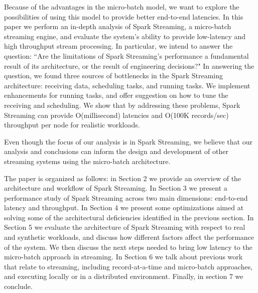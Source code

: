 
Because of the advantages in the micro-batch model, we want to explore the possibilities of using this model to provide better end-to-end latencies. In this paper we perform an in-depth analysis of Spark Streaming, a micro-batch streaming engine, and evaluate the system's ability to provide low-latency and high throughput stream processing.
In particular, we intend to answer the question: ``Are the limitations of Spark Streaming's performance a fundamental result of its architecture, or the result of engineering decisions?"
In answering the question, we found three sources of bottlenecks in the Spark Streaming architecture: receiving data, scheduling tasks, and running tasks. We implement enhancements for running tasks, and offer suggestion on how to tune the receiving and scheduling. We show that by addressing these problems, Spark Streaming can provide O(millisecond) latencies and O(100K records/sec) throughput per node for realistic workloads.

Even though the focus of our analysis is in Spark Streaming, we believe that our analysis and conclusions can inform the design and development of other streaming systems using the micro-batch architecture.

The paper is organized as follows: 
in Section 2 we provide an overview of the architecture and workflow of Spark Streaming. 
In Section 3 we present a performance study of Spark Streaming across two main dimensions: end-to-end latency and throughput.
In Section 4 we present some optimizations aimed at solving some of the architectural deficiencies identified in the previous section.
In Section 5 we evaluate the architecture of Spark Streaming with respect to real and synthetic workloads, and discuss how different factors affect the performance of the system. 
We then discuss the next steps needed to bring low latency to the micro-batch approach in streaming.
In Section 6 we talk about previous work that relate to streaming, including record-at-a-time and micro-batch approaches, and executing locally or in a distributed environment.
Finally, in section 7 we conclude.
